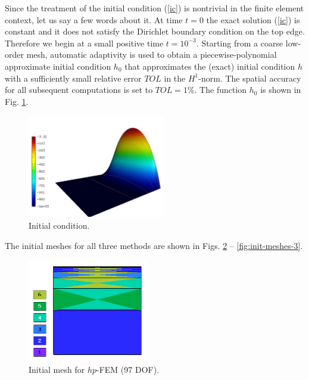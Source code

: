 \documentclass[final,3p,times,twocolumn]{elsarticle}
\begin{document}
Since the treatment of the initial condition (\ref{ic}) is nontrivial
in the finite element context, let us say a few words about it. 
At time $t = 0$ the exact solution (\ref{ic}) is constant and it 
does not satisfy the Dirichlet boundary condition on the top edge. 
Therefore we begin at a small positive time $t = 10^{-3}$.
Starting from a coarse low-order mesh, automatic adaptivity is used
to obtain a piecewise-polynomial approximate initial condition 
$h_0$ that approximates the (exact) initial condition $h$ with 
a sufficiently small relative error $TOL$ in the $H^1$-norm. The 
spatial accuracy for all subsequent computations is set to $TOL = 1\%$.
The function $h_0$ is shown in Fig. \ref{fig:init-cond}.

\begin{figure}[!ht]
\begin{center}
\includegraphics[height=4.5cm]{init-tracy.png}
\end{center}
\vspace{-6mm}
\caption{Initial condition.}
\label{fig:init-cond}
\end{figure}
\vspace{4mm}
\noindent
The initial meshes for all three methods are shown in 
Figs. \ref{fig:init-meshes-1} -- \ref{fig:init-meshes-3}.

\begin{figure}[!ht]
\begin{center}
\includegraphics[height=4.5cm]{mesh_init_hp.png}
\end{center}
\vspace{-6mm}
\caption{Initial mesh for $hp$-FEM (97 DOF).}
\label{fig:init-meshes-1}
\end{figure}
\end{document}

